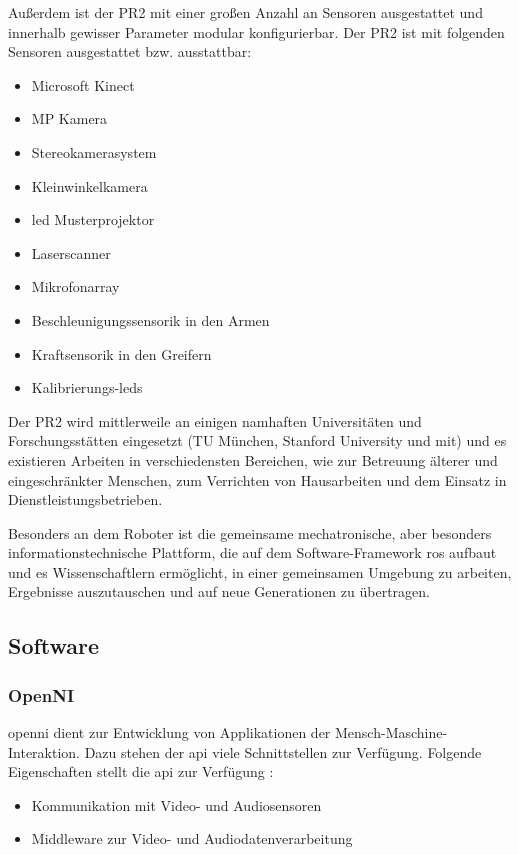 Außerdem ist der PR2 mit einer großen Anzahl an Sensoren ausgestattet und innerhalb gewisser Parameter modular konfigurierbar.
Der PR2 ist mit folgenden Sensoren ausgestattet bzw. ausstattbar:

\begin{itemize}
  \item Microsoft Kinect
  \item \unit[5]{MP} Kamera
  \item Stereokamerasystem
  \item Kleinwinkelkamera
  \item \gls{led} Musterprojektor
  \item Laserscanner
  \item Mikrofonarray
  \item Beschleunigungssensorik in den Armen
  \item Kraftsensorik in den Greifern
  \item Kalibrierungs-\glspl{led}
\end{itemize}

Der PR2 wird mittlerweile an einigen namhaften Universitäten und Forschungsstätten eingesetzt (\ua TU München, Stanford University und \gls{mit}) und es existieren Arbeiten in verschiedensten Bereichen, wie zur Betreuung älterer und eingeschränkter Menschen, zum Verrichten von Hausarbeiten  und dem Einsatz in Dienstleistungsbetrieben.

Besonders an dem Roboter ist die gemeinsame mechatronische, aber besonders informationstechnische Plattform, die auf dem Software-Framework \gls{ros} aufbaut und es Wissenschaftlern ermöglicht, in einer gemeinsamen Umgebung zu arbeiten, Ergebnisse auszutauschen und auf neue Generationen zu übertragen.



\subsection{Software}

\subsubsection{OpenNI}

\gls{openni} dient zur Entwicklung von Applikationen der Mensch-Maschine-Interaktion.
Dazu stehen der \gls{api} viele Schnittstellen zur Verfügung.
Folgende Eigenschaften stellt die \gls{api} zur Verfügung \cite{kinect_6}:

\begin{itemize}
  \item Kommunikation mit Video- und Audiosensoren
  \item Middleware zur Video- und Audiodatenverarbeitung
\end{itemize}

